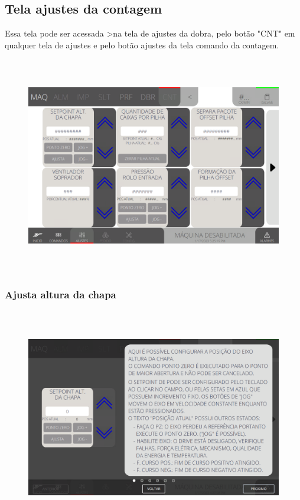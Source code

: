 \thispagestyle{fancy}
\vspace*{40 pt}
\subsection{Tela ajustes da contagem}
 Essa tela pode ser acessada \textgreater na tela de ajustes da dobra, pelo botão "CNT" em qualquer tela de ajustes e pelo botão ajustes da tela comando da contagem.
 \vspace*{\fill}
 \begin{figure}[h]
  \centering
  \includegraphics[width=576px,height=360px]{src/imagesFlexo/08-count/settings/e-Tela-Principal.png}
\end{figure}
\vspace*{\fill}

\newpage
\thispagestyle{fancy}
\vspace*{40 pt}
\subsubsection{\small{Ajusta altura da chapa}}
\vspace*{\fill}
\begin{figure}[h]
  \centering
  \includegraphics[width=576px,height=360px]{src/imagesFlexo/08-count/settings/e-1.png}
\end{figure}
\vspace*{\fill}

